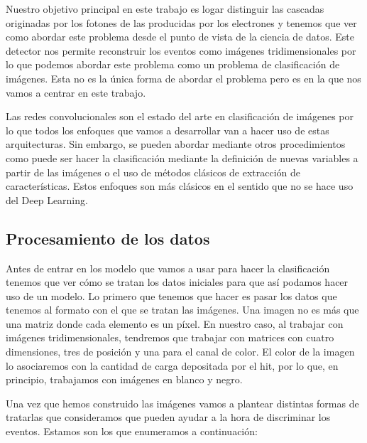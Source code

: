 \documentclass[a4paper,12pt,twoside,titlepage]{article}
\begin{document}
Nuestro objetivo principal en este trabajo es logar distinguir las cascadas originadas por los fotones de las producidas por los electrones y tenemos que ver como abordar este problema desde el punto de vista de la ciencia de datos. Este detector nos permite reconstruir los eventos como imágenes tridimensionales por lo que podemos abordar este problema como un problema de clasificación de imágenes. Esta no es la única forma de abordar el problema pero es en la que nos vamos a centrar en este trabajo.

Las redes convolucionales son el estado del arte en clasificación de imágenes por lo que todos los enfoques que vamos a desarrollar van a hacer uso de estas arquitecturas. Sin embargo, se pueden abordar mediante otros procedimientos como puede ser hacer la clasificación mediante la definición de nuevas variables a partir de las imágenes o el uso de métodos clásicos de extracción de características. Estos enfoques son más clásicos en el sentido que no se hace uso del Deep Learning.

\subsection{Procesamiento de los datos}
\label{sec:des_trat}
Antes de entrar en los modelo que vamos a usar para hacer la clasificación tenemos que ver cómo se tratan los datos iniciales para que así podamos hacer uso de un modelo. Lo primero que tenemos que hacer es pasar los datos que tenemos al formato con el que se tratan las imágenes. Una imagen no es más que una matriz donde cada elemento es un píxel. En nuestro caso, al trabajar con imágenes tridimensionales, tendremos que trabajar con matrices con cuatro dimensiones, tres de posición y una para el canal de color. El color de la imagen lo asociaremos con la cantidad de carga depositada por el hit, por lo que, en principio, trabajamos con imágenes en blanco y negro.

Una vez que hemos construido las imágenes vamos a plantear distintas formas de tratarlas que consideramos que pueden ayudar a la hora de discriminar los eventos. Estamos son los que enumeramos a continuación:
\end{document}
